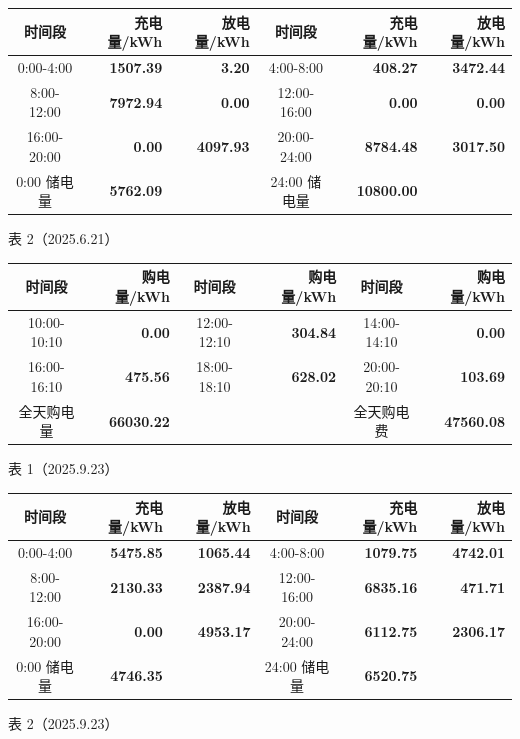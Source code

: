 {\begin{center}
\begin{minipage}[t]{0.485\linewidth}
\end{minipage}\hfill
\begin{minipage}[t]{0.485\linewidth}
\begin{tabular}{|c|r|r|c|r|r|}
\hline
时间段 & 充电量/kWh & 放电量/kWh & 时间段 & 充电量/kWh & 放电量/kWh \\
\hline
0:00-4:00 & \textbf{1507.39} & \textbf{3.20} & 4:00-8:00 & \textbf{408.27} & \textbf{3472.44} \\
\hline
8:00-12:00 & \textbf{7972.94} & \textbf{0.00} & 12:00-16:00 & \textbf{0.00} & \textbf{0.00} \\
\hline
16:00-20:00 & \textbf{0.00} & \textbf{4097.93} & 20:00-24:00 & \textbf{8784.48} & \textbf{3017.50} \\
\hline
0:00 储电量 & \textbf{5762.09} & & 24:00 储电量 & \textbf{10800.00} & \\
\hline
\end{tabular}
\par{表 2（2025.6.21）}

\end{minipage}
\vspace{0.15\baselineskip}
\noindent
\begin{minipage}[t]{0.485\linewidth}
\begin{tabular}{|c|r|c|r|c|r|}
\hline
时间段 & 购电量/kWh & 时间段 & 购电量/kWh & 时间段 & 购电量/kWh \\
\hline
10:00-10:10 & \textbf{0.00} & 12:00-12:10 & \textbf{304.84} & 14:00-14:10 & \textbf{0.00} \\
\hline
16:00-16:10 & \textbf{475.56} & 18:00-18:10 & \textbf{628.02} & 20:00-20:10 & \textbf{103.69} \\
\hline
全天购电量 & \textbf{66030.22} & & & 全天购电费 & \textbf{47560.08} \\
\hline
\end{tabular}
\par{表 1（2025.9.23）}

\end{minipage}\hfill
\begin{minipage}[t]{0.485\linewidth}
\begin{tabular}{|c|r|r|c|r|r|}
\hline
时间段 & 充电量/kWh & 放电量/kWh & 时间段 & 充电量/kWh & 放电量/kWh \\
\hline
0:00-4:00 & \textbf{5475.85} & \textbf{1065.44} & 4:00-8:00 & \textbf{1079.75} & \textbf{4742.01} \\
\hline
8:00-12:00 & \textbf{2130.33} & \textbf{2387.94} & 12:00-16:00 & \textbf{6835.16} & \textbf{471.71} \\
\hline
16:00-20:00 & \textbf{0.00} & \textbf{4953.17} & 20:00-24:00 & \textbf{6112.75} & \textbf{2306.17} \\
\hline
0:00 储电量 & \textbf{4746.35} & & 24:00 储电量 & \textbf{6520.75} & \\
\hline
\end{tabular}
\par{表 2（2025.9.23）}


\end{minipage}
\end{center}}
